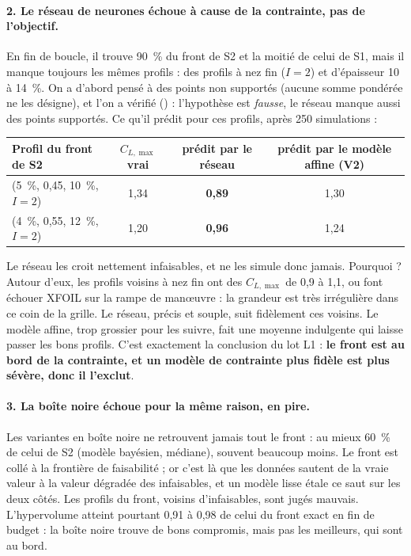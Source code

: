 \paragraph{2. Le réseau de neurones échoue à cause de la contrainte, pas de l'objectif.} En fin de boucle, il trouve 90~\% du front de S2 et la moitié de celui de S1, mais il manque toujours les mêmes profils : des profils à nez fin ($I=2$) et d'épaisseur 10 à 14~\%. On a d'abord pensé à des points non supportés (aucune somme pondérée ne les désigne), et l'on a vérifié () : l'hypothèse est \emph{fausse}, le réseau manque aussi des points supportés. Ce qu'il prédit pour ces profils, après 250 simulations :
\begin{center}
\renewcommand{\arraystretch}{1.2}
\small
\begin{tabular}{lccc}
\toprule
Profil du front de S2 & $C_{L,\max}$ vrai & prédit par le réseau & prédit par le modèle affine (V2) \\
\midrule
(5~\%, 0,45, 10~\%, $I=2$) & 1,34 & \textbf{0,89} & 1,30 \\
(4~\%, 0,55, 12~\%, $I=2$) & 1,20 & \textbf{0,96} & 1,24 \\
\bottomrule
\end{tabular}
\end{center}
Le réseau les croit nettement infaisables, et ne les simule donc jamais. Pourquoi ? Autour d'eux, les profils voisins à nez fin ont des $C_{L,\max}$ de 0,9 à 1,1, ou font échouer XFOIL sur la rampe de manœuvre : la grandeur est très irrégulière dans ce coin de la grille. Le réseau, précis et souple, suit fidèlement ces voisins. Le modèle affine, trop grossier pour les suivre, fait une moyenne indulgente qui laisse passer les bons profils. C'est exactement la conclusion du lot L1 : \textbf{le front est au bord de la contrainte, et un modèle de contrainte plus fidèle est plus sévère, donc il l'exclut}.

\paragraph{3. La boîte noire échoue pour la même raison, en pire.} Les variantes en boîte noire ne retrouvent jamais tout le front : au mieux 60~\% de celui de S2 (modèle bayésien, médiane), souvent beaucoup moins. Le front est collé à la frontière de faisabilité ; or c'est là que les données sautent de la vraie valeur à la valeur dégradée des infaisables, et un modèle lisse étale ce saut sur les deux côtés. Les profils du front, voisins d'infaisables, sont jugés mauvais. L'hypervolume atteint pourtant 0,91 à 0,98 de celui du front exact en fin de budget : la boîte noire trouve de bons compromis, mais pas les meilleurs, qui sont au bord.

